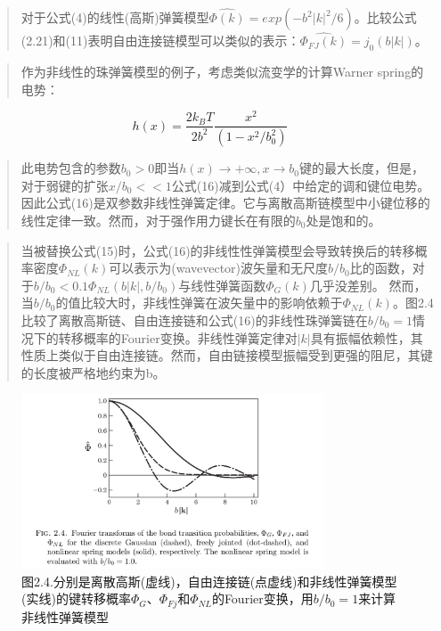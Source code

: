 			\begin{quotation}
				对于公式(4)的线性(高斯)弹簧模型$\hat{\varPhi(k)}=exp(-b^2|k|^2/6)$。比较公式(2.21)和(11)表明自由连接链模型可以类似的表示：$\hat{\varPhi_{FJ}(k)}=j_{0}(b|k|)$。
			\end{quotation}
			\begin{quotation}
				作为非线性的珠弹簧模型的例子，考虑类似流变学的计算Warner spring的电势：
			\end{quotation}
			\begin{equation}
			h(x)=\frac{2k_{B}T}{2b^2}\frac{x^2}{(1-x^2/b_{0}^2)}
			\end{equation}
			\begin{quotation}
				此电势包含的参数$b_{0}>0$即当$h(x)\to +\infty,x\to b_{0}$键的最大长度，但是，对于弱键的扩张$x/b_{0}<<1$公式(16)减到公式(4）中给定的调和键位电势。因此公式(16)是双参数非线性弹簧定律。它与离散高斯链模型中小键位移的线性定律一致。然而，对于强作用力键长在有限的$b_{0}$处是饱和的。
			\end{quotation}
			\begin{quotation}
				当被替换公式(15)时，公式(16)的非线性性弹簧模型会导致转换后的转移概率密度$\varPhi_{NL}(k)$可以表示为(wavevector)波矢量和无尺度$b/b_{0}$比的函数，对于$b/b_{0}<0.1 \varPhi_{NL}(b|k|,b/b_{0})$与线性弹簧函数$\varPhi_{G}(k)$几乎没差别。 然而，
				当$b/b_{0}$的值比较大时，非线性弹簧在波矢量中的影响依赖于$\varPhi_{NL}(k)$。图2.4比较了离散高斯链、自由连接链和公式(16)的非线性珠弹簧链在$b/b_{0}=1$情况下的转移概率的Fourier变换。非线性弹簧定律对$|k|$具有振幅依赖性，其性质上类似于自由连接链。然而，自由链接模型振幅受到更强的阻尼，其键的长度被严格地约束为b。
			\end{quotation}
			\begin{figure}[ht]
				\caption{图2.4.分别是离散高斯(虚线)，自由连接链(点虚线)和非线性弹簧模型(实线)的键转移概率$\varPhi_{G}$、$\varPhi_{Fj}$和$\varPhi_{NL}$的Fourier变换，用$b/b_{0}=1$来计算非线性弹簧模型}
				\centering
				\includegraphics[width=9cm]{./figures/2.png}
			\end{figure}
%
